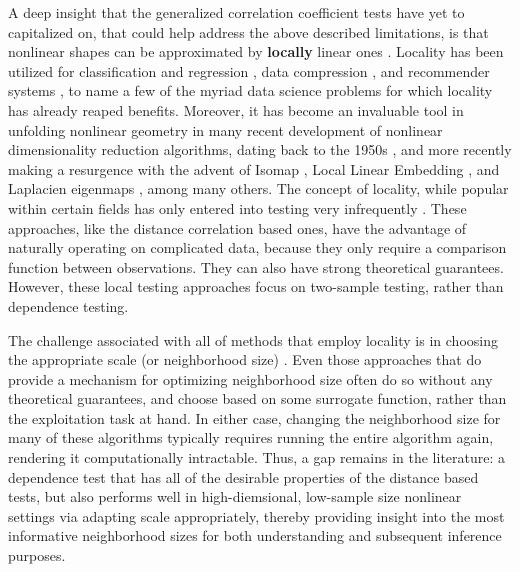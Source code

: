 \documentclass[11pt]{article}
\begin{document}
A deep insight that the generalized correlation coefficient tests  have yet to capitalized on, %
that could help address the above described limitations, 
is that nonlinear shapes can be approximated by \textbf{locally} linear ones \cite{Allard2012}.  Locality has been utilized for classification and regression  \cite{Stone1977}, data compression \cite{DaubechiesWaveletBook}, and recommender systems \cite{Sarwar2000}, to name a few of the myriad data science problems for which locality has already reaped benefits.
Moreover, it has become an invaluable tool in unfolding nonlinear geometry in many recent development of nonlinear dimensionality reduction algorithms, dating back to the 1950s \cite{TorgersonBook}, and more recently making a resurgence with the advent of  Isomap \cite{TenenbaumSilvaLangford2000, SilvaTenenbaum2003}, Local Linear Embedding \cite{SaulRoweis2000, RoweisSaul2003}, and Laplacien eigenmaps \cite{BelkinNiyogi2003}, among many others. The concept of locality, while popular within certain fields has only entered into  testing very infrequently
\cite{David1966,Friedman1983,Schilling1986}.  These approaches, like the distance correlation based ones, have the advantage of naturally operating on complicated data, because they only require a comparison function between observations.  They can also have strong theoretical guarantees. 
However, these local testing approaches focus on two-sample testing, rather than dependence testing. 

The challenge associated with all of methods that employ locality is in choosing the appropriate scale (or neighborhood size) \cite{ShenVogelsteinPriebe2016}.  Even those approaches that do provide a mechanism for optimizing  neighborhood size often do so without any theoretical guarantees, and choose based on some surrogate function, rather than the exploitation task at hand. In either case, changing the neighborhood size for many of these algorithms typically requires running the entire algorithm again, rendering it computationally intractable. 
Thus, a gap remains in the literature: a dependence test that has all of the desirable properties of the distance based tests, but also performs well in high-diemsional, low-sample size nonlinear settings via adapting scale appropriately, thereby providing insight into the most informative neighborhood sizes for both understanding and subsequent inference purposes.  
\end{document}
